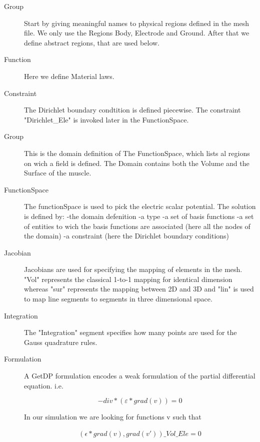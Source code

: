 \documentclass[preprint,journal]{vgtc}       %
\begin{document}
\begin{description}
	\item[Group]
	Start by giving meaningful names to physical regions defined in the mesh file.
	We only use the Regions Body, Electrode and Ground. After that we define abstract regions, that are used below.
	\item[Function]
	Here we define Material laws.
	\item[Constraint]
	The Dirichlet boundary condtition is defined piecewise. The constraint "Dirichlet\_Ele" is invoked later in the FunctionSpace.
	\item[Group]
	This is the domain definition of The FunctionSpace, which lists al regions on wich a field is defined. The Domain contains both the Volume and the Surface of the muscle.
	\item[FunctionSpace]
	The functionSpace is used to pick the electric scalar potential. The solution is defined  by:\newline
	-the domain defenition\newline
	-a type\newline
	-a set of basis functions\newline %
	-a set of entities to wich the basis functions are associated (here all the nodes of the domain)\newline
	-a constraint (here the Dirichlet boundary conditions)\newline
	\item[Jacobian] %
	Jacobians are used for specifying the mapping of elements in the mesh.
	"Vol" represents the classical 1-to-1 mapping for identical dimension whereas
	"sur" represents the mapping between 2D and 3D and "lin" is used to map line segments to segments in three dimensional space.
	\item[Integration]
	The "Integration" segment specifies how many points are used for the Gauss quadrature rules. %
	\item[Formulation]
	A GetDP formulation encodes a weak formulation of the partial differential equation. i.e. 
	
	\begin{equation*}
	{-div}*(\varepsilon *grad{(v)}) = 0
	\end{equation*}
	
	In our simulation we are looking for functions v such that 
	
	\begin{align*} %
	({\epsilon * grad {(v)}, grad {(v')}}) \_Vol\_Ele =  0
	\end{align*}
	

\end{description}
\end{document}
